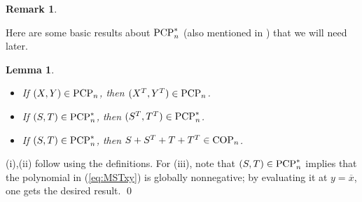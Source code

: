 \documentclass[11pt]{article}
\makeatletter
\newcommand{\R}{\ensuremath{\mathbb{R}}}   %
\newcommand{\Herm}{\mathrm{Herm}}
\newcommand{\PCP}{\text{\rm PCP}}
\newcommand{\CP}{\text{\rm CP}}
\newcommand{\COP}{\text{\rm COP}}
\newcommand{\diag}{\text{\rm diag}}
\newcommand{\Diag}{\text{\rm Diag}}
\newcommand{\ovx}{\overline x}
\theoremstyle{plain}
\newtheorem{lemma}[satz]{Lemma}
\newtheorem{remark}[satz]{Remark}
\renewenvironment{proof}[1][\proofname]{%
  \par
  \pushQED{}%
  \normalfont
  \topsep6\p@\@plus6\p@
  \trivlist
  \item[\hskip\labelsep\itshape #1\@addpunct{.}]%
}{%
  \popQED
  \endtrivlist
}
\newcommand{\ML}{\textcolor{blue}}
\makeatother
\begin{document}
\begin{remark}

\end{remark}


Here are some basic results about $\PCP_n^*$ (also mentioned in \cite{GNP_2025}) that we will need later.

\begin{lemma}\label{lem:PCP-dual1}
\begin{itemize}
\item[(i)]
If $(X,Y)\in \PCP_n$, then $(X^T,Y^T)\in \PCP_n$.%
\item[(ii)] If $(S,T)\in \PCP_n^*$, then $(S^T,T^T)\in \PCP_n^*$.
\item[(iii)]
If $(S,T)\in \PCP_n^*$, then   $S+S^T+T+T^T\in \COP_n$.
\end{itemize}\end{lemma} 
\begin{proof}
(i),(ii) follow using the definitions. For (iii), note that  $(S,T) \in\PCP_n^*$ implies that the polynomial in (\ref{eq:MSTxy}) is globally nonnegative; by evaluating it at $y=\ovx$, one gets the desired result.%
\qed\end{proof}

\end{document}

